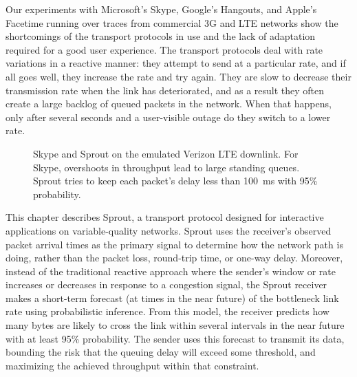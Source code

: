 Our experiments with Microsoft's Skype, Google's Hangouts, and Apple's
Facetime running over traces from commercial 3G and LTE networks show
the shortcomings of the transport protocols in use and the lack of
adaptation required for a good user experience.
The transport protocols deal with rate variations in a reactive
manner: they attempt to send at a particular rate, and if all goes
well, they increase the rate and try again. They are slow to
decrease their transmission rate when the link has deteriorated, and as a
result they often create a large backlog of queued packets in the
network. When that happens, only after several seconds and a
user-visible outage do they switch to a lower rate.


\begin{figure}
\caption{Skype and Sprout on the emulated Verizon LTE downlink. For Skype, overshoots in throughput lead to large standing queues. Sprout tries to keep each
packet's delay less than 100~ms with 95\% probability.}
\label{fig:skypevssprout}
\vspace{\baselineskip}
\def\svgwidth{\columnwidth}
\end{figure}

This chapter describes Sprout, a transport protocol designed for
interactive applications on variable-quality networks. Sprout uses the
receiver's observed packet arrival times as the primary signal to
determine how the network path is doing, rather than the packet loss,
round-trip time, or one-way delay. Moreover, instead of the
traditional reactive approach where the sender's window or rate
increases or decreases in response to a congestion signal, the Sprout
receiver makes a short-term forecast (at times in the near future) of
the bottleneck link rate using probabilistic inference.  From this
model, the receiver predicts how many bytes are likely to cross the
link within several intervals in the near future with at least 95\%
probability. The sender uses this forecast to transmit its data,
bounding the risk that the queuing delay will exceed some threshold,
and maximizing the achieved throughput within that constraint.

